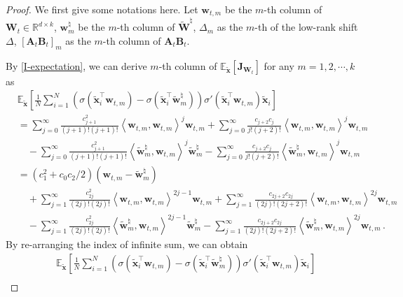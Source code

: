 \begin{proof}
We first give some notations here. Let $\bm w_{t,m}$ be the $m$-th column of $\bm W_t \in \mathbb{R}^{d \times k}$, $\bm w^\natural_m$ be the $m$-th column of $\widetilde{\bm W}^\natural$, $\Delta_m$ as the $m$-th of the low-rank shift $\Delta$, $[\bm A_t \bm B_t]_m$ as the $m$-th column of $\bm A_t \bm B_t$.

By \cref{I-expectation}, we can derive $m$-th column of $\mathbb{E}_{\widetilde{\bm x}}\left[\bm J_{\bm W_t}\right]$ for any $m=1,2,\cdots,k$ as
\begin{align*}
    & \mathbb{E}_{\widetilde{\bm x}}\left[\frac{1}{N}\sum_{i=1}^N\left(\sigma \left(\widetilde{\bm x}_i^{\!\top}{\bm w}_{t,m}\right)-\sigma \left(\widetilde{\bm x}_i^{\!\top}\widetilde{\bm w}_m^\natural\right)\right)\sigma' \left(\widetilde{\bm x}_i^{\!\top}\bm w_{t,m}\right)\widetilde{\bm x}_i\right]\\
    & = \sum_{j=0}^{\infty}\frac{c_{j+1}^2}{(j+1)!(j+1)!}\left\langle{\bm w}_{t,m},{\bm w}_{t,m}\right\rangle^{j}{\bm w}_{t,m} + \sum_{j= 0}^{\infty}\frac{c_{j+2}c_{j}}{j!(j+2)!}\left\langle{\bm w}_{t,m},{\bm w}_{t,m}\right\rangle^{j}{\bm w}_{t,m}\\
    & \quad -\sum_{j=0}^{\infty}\frac{c_{j+1}^2}{(j+1)!(j+1)!}\left\langle\widetilde{\bm w}^\natural_m,{\bm w}_{t,m}\right\rangle^{j}\widetilde{\bm w}^\natural_m - \sum_{j= 0}^{\infty}\frac{c_{j+2}c_{j}}{j!(j+2)!}\left\langle\widetilde{\bm w}^\natural_m,{\bm w}_{t,m}\right\rangle^{j}{\bm w}_{t,m}\\
    & = \left(c_1^2+c_0 c_2 / 2\right) \left(\bm w_{t,m}-\widetilde{\bm w}^\natural_m\right)\\
    & \quad + \sum_{j=1}^{\infty}\frac{c_{2j}^2}{(2j)!(2j)!}\left\langle{\bm w}_{t,m},{\bm w}_{t,m}\right\rangle^{2j-1}{\bm w}_{t,m} + \sum_{j= 1}^{\infty}\frac{c_{2j+2}c_{2j}}{(2j)!(2j+2)!}\left\langle{\bm w}_{t,m},{\bm w}_{t,m}\right\rangle^{2j}{\bm w}_{t,m}\\
    & \quad -\sum_{j=1}^{\infty}\frac{c_{2j}^2}{(2j)!(2j)!}\left\langle\widetilde{\bm w}^\natural_m,{\bm w}_{t,m}\right\rangle^{2j-1}\widetilde{\bm w}^\natural_m - \sum_{j= 1}^{\infty}\frac{c_{2j+2}c_{2j}}{(2j)!(2j+2)!}\left\langle\widetilde{\bm w}^\natural_m,{\bm w}_{t,m}\right\rangle^{2j}{\bm w}_{t,m}\,.
\end{align*}
By re-arranging the index of infinite sum, we can obtain
\begin{align*}
    & \mathbb{E}_{\widetilde{\bm x}}\left[\frac{1}{N}\sum_{i=1}^N\left(\sigma \left(\widetilde{\bm x}_i^{\!\top}{\bm w}_{t,m}\right)-\sigma \left(\widetilde{\bm x}_i^{\!\top}\widetilde{\bm w}_m^\natural\right)\right)\sigma' \left(\widetilde{\bm x}_i^{\!\top}\bm w_{t,m}\right)\widetilde{\bm x}_i\right]\\

\end{align*}
\end{proof}
